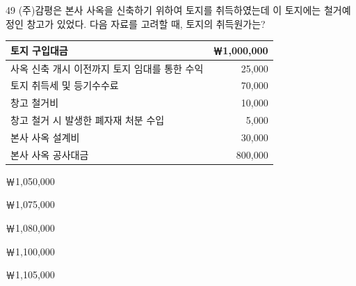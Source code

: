 \begin{question}{49}
(주)감평은 본사 사옥을 신축하기 위하여 토지를 취득하였는데 이 토지에는 철거예정인 창고가 있었다. 다음 자료를 고려할 때, 토지의 취득원가는?
\par{\small\centering
\begin{tabular}{|l|r|}
\hline
토지 구입대금 & ￦1,000,000 \\ \hline
사옥 신축 개시 이전까지 토지 임대를 통한 수익 & 25,000 \\ \hline
토지 취득세 및 등기수수료 & 70,000 \\ \hline
창고 철거비 & 10,000 \\ \hline
창고 철거 시 발생한 폐자재 처분 수입 & 5,000 \\ \hline
본사 사옥 설계비 & 30,000 \\ \hline
본사 사옥 공사대금 & 800,000 \\ \hline
\end{tabular}\par}
\begin{choices}
  \item ￦1,050,000
  \item ￦1,075,000
  \item ￦1,080,000
  \item ￦1,100,000
  \item ￦1,105,000
\end{choices}
\end{question}
